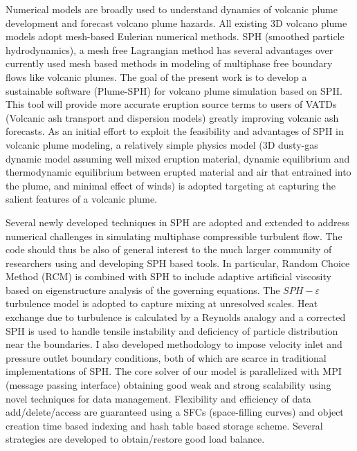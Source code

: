 Numerical models are broadly used to understand dynamics of volcanic plume development and forecast volcano plume hazards. All existing 3D volcano plume models adopt mesh-based Eulerian numerical methods. 
SPH (smoothed particle hydrodynamics), a mesh free Lagrangian method has several advantages over currently used mesh based methods in modeling of multiphase free boundary flows like volcanic plumes. The goal of the present work is to develop a sustainable software (Plume-SPH) for volcano plume simulation based on SPH.
This tool will provide more accurate eruption source terms to users of VATDs (Volcanic ash transport and dispersion models) greatly improving volcanic ash forecasts.
As an initial effort to exploit the feasibility and advantages of SPH in volcanic plume modeling, a relatively simple physics model (3D dusty-gas dynamic model assuming well mixed eruption material, dynamic equilibrium and thermodynamic equilibrium between erupted material and air that entrained into the plume, and minimal effect of winds) is adopted targeting at capturing the salient features of a volcanic plume. 
 
Several newly developed techniques in SPH are adopted and extended to address numerical challenges in simulating multiphase compressible turbulent flow. The code should thus be also of general interest to the much larger community of researchers using and developing SPH based tools. In particular, Random Choice Method (RCM) is combined with SPH to include adaptive artificial viscosity based on eigenstructure analysis of the governing equations. The $SPH-\varepsilon$ turbulence model is adopted to capture mixing at unresolved scales. Heat exchange due to turbulence is calculated by a Reynolds analogy and a corrected SPH is used to handle tensile instability and deficiency of particle distribution near the boundaries. I also developed methodology to impose velocity inlet and pressure outlet boundary conditions, both of which are scarce in traditional implementations of SPH.
The core solver of our model is parallelized with MPI (message passing interface) obtaining good weak and strong scalability using novel techniques for data management. Flexibility and efficiency of data add/delete/access are guaranteed using a SFCs (space-filling curves) and object creation time based indexing and hash table based storage scheme. Several strategies are developed to obtain/restore good load balance.

